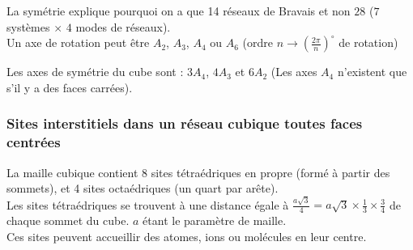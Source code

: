 \documentclass{article}
\begin{document}
\noindent La symétrie explique pourquoi on a que 14 réseaux de Bravais et non $28$ ($7$ systèmes $\times$ $4$ modes de réseaux).\\
Un axe de rotation peut être $A_2$, $A_3$, $A_4$ ou $A_6$ (ordre $n \rightarrow (\frac{2\pi}{n})^{\circ}$ de rotation)

\noindent Les axes de symétrie du cube sont : $3A_4$, $4A_3$ et $6A_2$ (Les axes $A_4$ n'existent que s'il y a des faces carrées).

\vspace{0.4cm}

\subsubsection{Sites interstitiels dans un réseau cubique toutes faces centrées}\label{subsec:sites-intersticiels-dans-un-reseau-cubique-toutes-faces-centrees}

La maille cubique contient 8 sites tétraédriques en propre (formé à partir des sommets), et 4 sites octaédriques (un quart par arête).\\
Les sites tétraédriques se trouvent à une distance égale à $\frac{a\sqrt{3}}{4} = a\sqrt{3} \times \frac{1}{3} \times \frac{3}{4}$ de chaque sommet du cube. $a$ étant le paramètre de maille.\\
Ces sites peuvent accueillir des atomes, ions ou molécules en leur centre.
\end{document}
